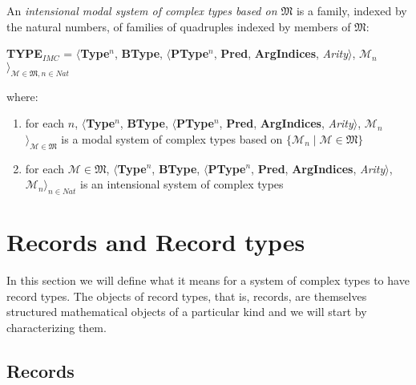 An {\it intensional modal system of complex types based on $\mathfrak{M}$\/} is a family,
indexed by the natural numbers, of families of quadruples indexed by
members of $\mathfrak{M}$:
\begin{display}
{\bf TYPE$_\mathit{IMC}$} = $\langle${\bf Type}$^n$, {\bf BType},
$\langle$\textbf{PType}$^n$, {\bf Pred}, \textbf{ArgIndices}, {\it
  Arity\/}$\rangle$, $\mathscr{M}_n$$\rangle_{\mathscr{M}\in\mathfrak{M},n\in\mathit{Nat}}$
\end{display}
where:
\begin{enumerate} 
 
\item for each $n$, $\langle${\bf Type}$^n$, {\bf BType},
$\langle$\textbf{PType}$^n$, {\bf Pred}, \textbf{ArgIndices}, {\it
  Arity\/}$\rangle$, $\mathscr{M}_n$$\rangle_{\mathscr{M}\in\mathfrak{M}}$ is a modal
  system of complex types based on $\{\mathscr{M}_n\mid \mathscr{M}\in\mathfrak{M}\}$ 
 
\item for each $\mathscr{M}\in\mathfrak{M}$, $\langle${\bf Type}$^n$, {\bf BType},
$\langle$\textbf{PType}$^n$, {\bf Pred}, \textbf{ArgIndices}, {\it
  Arity\/}$\rangle$, $\mathscr{M}_n$$\rangle_{n\in\mathit{Nat}}$ is an
  intensional system of complex types
 
\end{enumerate} 
 


\section{Records and Record types}
\label{app:rectypes}



In this section we will define what it means for a system of complex
types to have record types.  The objects of record types, that is,
records, are themselves structured mathematical objects of a
particular kind and we will
start by characterizing them.

\subsection{Records}
\label{app:rec}


